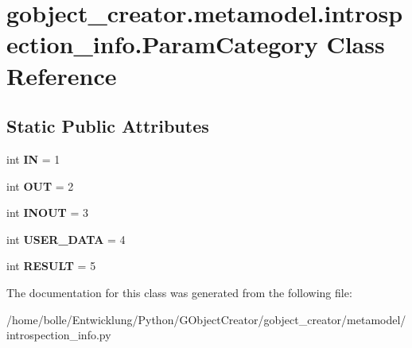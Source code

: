 \hypertarget{classgobject__creator_1_1metamodel_1_1introspection__info_1_1ParamCategory}{
\section{gobject\_\-creator.metamodel.introspection\_\-info.ParamCategory Class Reference}
\label{classgobject__creator_1_1metamodel_1_1introspection__info_1_1ParamCategory}
}
\subsection*{Static Public Attributes}
\begin{DoxyCompactItemize}
\item 
\hypertarget{classgobject__creator_1_1metamodel_1_1introspection__info_1_1ParamCategory_a047ef16230d31526b103beda5f94a0ef}{
int {\bfseries IN} = 1}
\label{classgobject__creator_1_1metamodel_1_1introspection__info_1_1ParamCategory_a047ef16230d31526b103beda5f94a0ef}

\item 
\hypertarget{classgobject__creator_1_1metamodel_1_1introspection__info_1_1ParamCategory_a6533786f39f1609e40b02708711831ed}{
int {\bfseries OUT} = 2}
\label{classgobject__creator_1_1metamodel_1_1introspection__info_1_1ParamCategory_a6533786f39f1609e40b02708711831ed}

\item 
\hypertarget{classgobject__creator_1_1metamodel_1_1introspection__info_1_1ParamCategory_a0a247c83949be0686f9afdd6aa42b064}{
int {\bfseries INOUT} = 3}
\label{classgobject__creator_1_1metamodel_1_1introspection__info_1_1ParamCategory_a0a247c83949be0686f9afdd6aa42b064}

\item 
\hypertarget{classgobject__creator_1_1metamodel_1_1introspection__info_1_1ParamCategory_a6011a45abb5a0f04f3c3cb5cc1717278}{
int {\bfseries USER\_\-DATA} = 4}
\label{classgobject__creator_1_1metamodel_1_1introspection__info_1_1ParamCategory_a6011a45abb5a0f04f3c3cb5cc1717278}

\item 
\hypertarget{classgobject__creator_1_1metamodel_1_1introspection__info_1_1ParamCategory_ac35addca684afc507387e09a4b61ee04}{
int {\bfseries RESULT} = 5}
\label{classgobject__creator_1_1metamodel_1_1introspection__info_1_1ParamCategory_ac35addca684afc507387e09a4b61ee04}

\end{DoxyCompactItemize}


The documentation for this class was generated from the following file:\begin{DoxyCompactItemize}
\item 
/home/bolle/Entwicklung/Python/GObjectCreator/gobject\_\-creator/metamodel/introspection\_\-info.py\end{DoxyCompactItemize}
